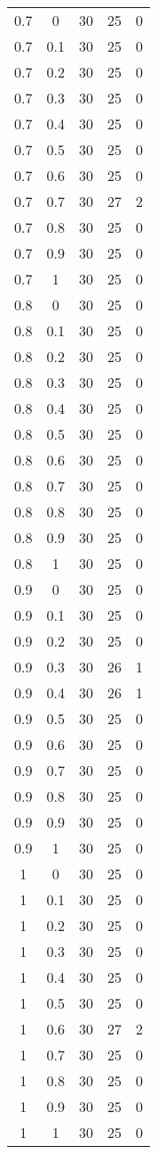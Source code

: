 \begin{longtable}{|c|c|c|c|c|}
	0.7& 0& 30& 25& 0\\
	0.7& 0.1& 30& 25& 0\\
	0.7& 0.2& 30& 25& 0\\
	0.7& 0.3& 30& 25& 0\\
	0.7& 0.4& 30& 25& 0\\
	0.7& 0.5& 30& 25& 0\\
	0.7& 0.6& 30& 25& 0\\
	0.7& 0.7& 30& 27& 2\\
	0.7& 0.8& 30& 25& 0\\
	0.7& 0.9& 30& 25& 0\\
	0.7& 1& 30& 25& 0\\
	\hline
	
	0.8& 0& 30& 25& 0\\
	0.8& 0.1& 30& 25& 0\\
	0.8& 0.2& 30& 25& 0\\
	0.8& 0.3& 30& 25& 0\\
	0.8& 0.4& 30& 25& 0\\
	0.8& 0.5& 30& 25& 0\\
	0.8& 0.6& 30& 25& 0\\
	0.8& 0.7& 30& 25& 0\\
	0.8& 0.8& 30& 25& 0\\
	0.8& 0.9& 30& 25& 0\\
	0.8& 1& 30& 25& 0\\
	\hline
	
	0.9& 0& 30& 25& 0\\
	0.9& 0.1& 30& 25& 0\\
	0.9& 0.2& 30& 25& 0\\
	0.9& 0.3& 30& 26& 1\\
	0.9& 0.4& 30& 26& 1\\
	0.9& 0.5& 30& 25& 0\\
	0.9& 0.6& 30& 25& 0\\
	0.9& 0.7& 30& 25& 0\\
	0.9& 0.8& 30& 25& 0\\
	0.9& 0.9& 30& 25& 0\\
	0.9& 1& 30& 25& 0\\
	\hline
	
	1& 0& 30& 25& 0\\
	1& 0.1& 30& 25& 0\\
	1& 0.2& 30& 25& 0\\
	1& 0.3& 30& 25& 0\\
	1& 0.4& 30& 25& 0\\
	1& 0.5& 30& 25& 0\\
	1& 0.6& 30& 27& 2\\
	1& 0.7& 30& 25& 0\\
	1& 0.8& 30& 25& 0\\
	1& 0.9& 30& 25& 0\\
	1& 1& 30& 25& 0\\
	
\end{longtable}


